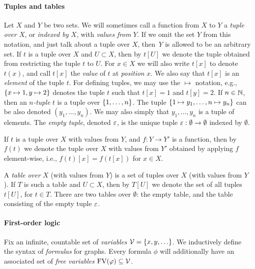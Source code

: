\paragraph{Tuples and tables}
Let $X$ and $Y$ be two sets.
We will sometimes call a function from $X$ to $Y$
a \emph{tuple over $X$}, or \emph{indexed by} $X$, with \emph{values from} $Y$. 
If we omit the set $Y$ from this notation, and 
just talk about a tuple over $X$, then~$Y$ is allowed to be an arbitrary set. 
If $t$ is a tuple over $X$ and $U\subset X$, then
by $t[U]$ we denote the tuple obtained from restricting the tuple $t$ to $U$. For $x\in X$ we will also write $t[x]$ to denote $t(x)$, and call $t[x]$ the \emph{value} of $t$ at \emph{position} $x$.
We also say that $t[x]$ is an \emph{element} of the tuple $t$.
For defining tuples, we may use the $\mapsto$ notation, e.g., $\{x\mapsto 1,y\mapsto 2\}$
denotes the tuple $t$ such that $t[x]=1$ and $t[y]=2$.
If $n\in\mathbb{N}$, then an \emph{$n$-tuple} $t$ is a tuple over $\{1,\ldots,n\}$. The tuple $\{1\mapsto y_1,\ldots,n\mapsto y_n\}$ can be also denoted $(y_1,\ldots,y_n)$. We may also simply that $y_1,\ldots,y_n$ is a tuple of elements.
The \emph{empty tuple}, denoted $\varepsilon$, is the unique tuple $\varepsilon:\emptyset\to\emptyset$ indexed by $\emptyset$.



If $t$ is a tuple over $X$ with values from $Y$,
and $f:Y\to Y'$ is a function, then by $f(t)$
we denote the tuple over $X$ with values from $Y'$ obtained by applying $f$ element-wise, i.e., $f(t)[x]=f(t[x])$ for $x\in X$.

A \emph{table over} $X$ (with values from $Y$) is a set of tuples over $X$ (with values from $Y$).
If $T$ is such a table and $U\subset X$, then by 
$T[U]$ we denote the set of all tuples $t[U]$, for $t\in T$.
There are two tables over $\emptyset$: the empty table, and the table consisting of the empty tuple $\varepsilon$.






\paragraph{First-order logic}
Fix an infinite, countable set of \emph{variables} $\mathcal{V}=\{x,y,\ldots\}$.
We inductively define the syntax  of \emph{formulas} for graphs.
Every formula $\phi$ will additionally have an associated set of \emph{free variables}
$\textrm{FV}(\varphi)\subseteq \mathcal{V}$.


